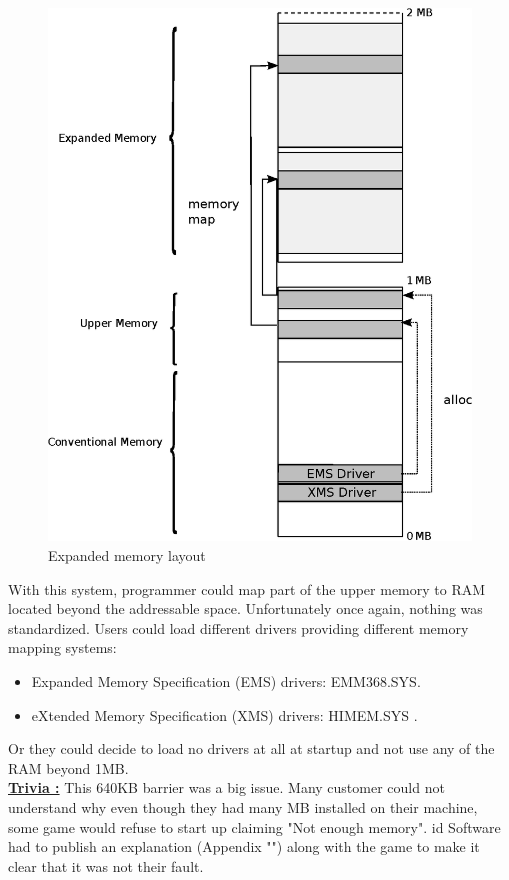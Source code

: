 \documentclass[book.tex]{subfiles}
\begin{document}
\begin{figure}[H]
\centering
\includegraphics[scale=1]{imgs/expanded_ram}
\caption{Expanded memory layout}
\label{fig:ems_xms_layout}
\end{figure}
With this system, programmer could map part of the upper memory to RAM located beyond the addressable space.
Unfortunately once again, nothing was standardized. Users could load different drivers providing different memory mapping systems:
\begin{itemize}
\item Expanded Memory Specification (EMS) drivers: EMM368.SYS.
\item eXtended Memory Specification (XMS) drivers: HIMEM.SYS .
\end{itemize}

Or they could decide to load no drivers at all at startup and not use any of the RAM beyond 1MB.\\
\textbf{\underline{Trivia :}}  This 640KB barrier was a big issue. Many customer could not understand why even though they had many MB installed on their machine, some game would refuse to start up claiming "Not enough memory". id Software had to publish an explanation (Appendix "") along with the game to make it clear that it was not their fault.\\
\end{document}
